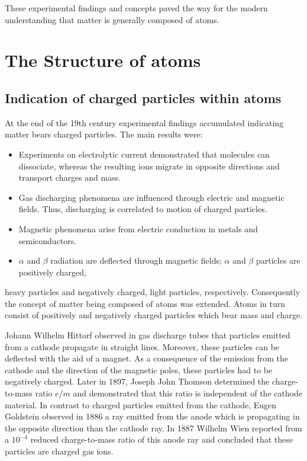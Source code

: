 \documentclass[
  a4paper,
]{book}
\providecommand{\tightlist}{%
  \setlength{\itemsep}{0pt}\setlength{\parskip}{0pt}}
\begin{document}
These experimental findings and concepts paved the way for the modern
understanding that matter is generally composed of atoms.

\section{The Structure of atoms}\label{the-structure-of-atoms}

\subsection{Indication of charged particles within
atoms}\label{indication-of-charged-particles-within-atoms}

At the end of the 19th century experimental findings accumulated
indicating matter bears charged particles. The main results were:

\begin{itemize}
\tightlist
\item
  Experiments on electrolytic current demonstrated that molecules can
  dissociate, whereas the resulting ions migrate in opposite directions
  and transport charges and mass.
\item
  Gas discharging phenomena are influenced through electric and magnetic
  fields. Thus, discharging is correlated to motion of charged
  particles.
\item
  Magnetic phenomena arise from electric conduction in metals and
  semiconductors.
\item
  \(\alpha\) and \(\beta\) radiation are deflected through magnetic
  fields; \(\alpha\) and \(\beta\) particles are positively charged,
\end{itemize}

heavy particles and negatively charged, light particles, respectively.
Consequently the concept of matter being composed of atoms was extended.
Atoms in turn consist of positively and negatively charged particles
which bear mass and charge.

Johann Wilhelm Hittorf observed in gas discharge tubes that particles
emitted from a cathode propagate in straight lines. Moreover, these
particles can be deflected with the aid of a magnet. As a consequence of
the emission from the cathode and the direction of the magnetic poles,
these particles had to be negatively charged. Later in 1897, Joseph John
Thomson determined the charge-to-mass ratio \(e/m\) and demonstrated
that this ratio is independent of the cathode material. In contrast to
charged particles emitted from the cathode, Eugen Goldstein observed in
1886 a ray emitted from the anode which is propagating in the opposite
direction than the cathode ray. In 1887 Wilhelm Wien reported from a
\(10^{-4}\) reduced charge-to-mass ratio of this anode ray and concluded
that these particles are charged gas ions.
\end{document}
